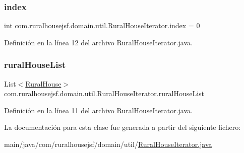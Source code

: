 \subsubsection{\texorpdfstring{index}{index}}
{\footnotesize\ttfamily int com.\+ruralhousejsf.\+domain.\+util.\+Rural\+House\+Iterator.\+index = 0\hspace{0.3cm}{\ttfamily [private]}}



Definición en la línea 12 del archivo Rural\+House\+Iterator.\+java.

\mbox{\label{a00200_a86506cdc509d2a232309bdcf939f4d51}} 
\subsubsection{\texorpdfstring{ruralHouseList}{ruralHouseList}}
{\footnotesize\ttfamily List$<$\mbox{\hyperlink{a00188}{Rural\+House}}$>$ com.\+ruralhousejsf.\+domain.\+util.\+Rural\+House\+Iterator.\+rural\+House\+List\hspace{0.3cm}{\ttfamily [private]}}



Definición en la línea 11 del archivo Rural\+House\+Iterator.\+java.



La documentación para esta clase fue generada a partir del siguiente fichero\+:\begin{DoxyCompactItemize}
\item 
main/java/com/ruralhousejsf/domain/util/\mbox{\hyperlink{a00056}{Rural\+House\+Iterator.\+java}}\end{DoxyCompactItemize}
